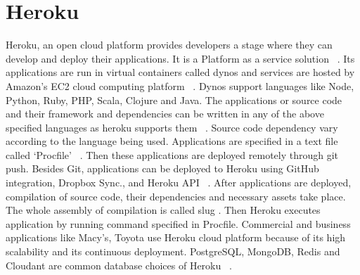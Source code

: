\section{Heroku}
 
 Heroku, an open cloud platform provides developers a stage where they can develop
 and deploy their applications. It is a Platform as a service
 solution ~\cite{hid-sp18-415-www-heroku}.
 Its applications are run in virtual containers called dynos and services are hosted by
 Amazon’s EC2 cloud computing platform ~\cite{hid-sp18-415-wikipedia-org}. Dynos
 support languages like
 Node, Python, Ruby, PHP, Scala, Clojure and Java. The applications or source code and
 their framework and dependencies can be written in any of the above specified languages
 as heroku supports them ~\cite{hid_sp18-415-how-heroku-works}. Source code dependency
 vary according to the language being used. Applications are specified in a text file
 called ‘Procfile’ ~\cite{hid_sp18-415-how-heroku-works}. Then these applications
 are deployed remotely through git push. Besides Git, applications can be deployed
 to Heroku using GitHub integration, Dropbox Sync., and Heroku 
 API ~\cite{hid_sp18-415-how-heroku-works}. After applications are deployed, compilation
 of source code, their dependencies and necessary assets take
 place. The whole assembly of compilation is called slug \cite{hid_sp18-415-how-heroku-works}.
 Then Heroku executes application by running command specified in Procfile.
 Commercial and business applications like Macy’s, Toyota use Heroku cloud platform
 because of its high scalability and its continuous deployment. PostgreSQL, MongoDB,
 Redis and Cloudant are common database choices of Heroku ~\cite{hid-sp18-415-www-heroku}.
